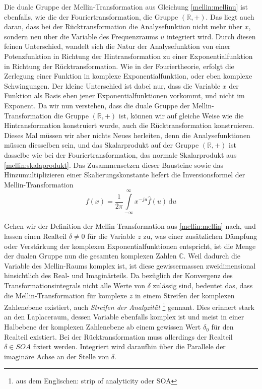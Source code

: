 Die duale Gruppe der Mellin-Transformation aus Gleichung \eqref{mellin:mellinu} ist ebenfalls, wie die der Fouriertransformation, die Gruppe 
$(\mathbb{R},+)$.
Das liegt auch daran, dass bei der Rücktransformation die Analysefunktion nicht mehr über $x$, sondern neu über die Variable des 
Frequenzraums $u$ integriert wird. 
Durch diesen feinen Unterschied, wandelt sich die Natur der Analysefunktion von einer Potenzfunktion in Richtung der Hintransformation zu 
einer Exponentialfunktion in Richtung der Rücktransformation.
Wie in der Fouriertheorie, erfolgt die Zerlegung einer Funktion in komplexe Exponentialfunktion, oder eben komplexe Schwingungen.
Der kleine Unterschied ist dabei nur, dass die Variable $x$ der Funktion als Basis eben jener Exponentialfunktionen vorkommt, und nicht 
im Exponent.
Da wir nun verstehen, dass die duale Gruppe der Mellin-Transformation die Gruppe $(\mathbb{R},+)$ ist, können wir auf gleiche Weise wie 
die Hintransformation konstruiert wurde, auch die Rücktransformation konstruieren.
Dieses Mal müssen wir aber nichts Neues herleiten, denn die Analysefunktionen müssen diesselben sein, und das Skalarprodukt auf der 
Gruppe $(\mathbb{R},+)$ ist dasselbe wie bei der Fouriertransformation, das normale Skalarprodukt aus \eqref{mellin:skalaprodukt}. 
Das Zusammensetzen dieser Bausteine sowie das Hinzumultiplizieren einer Skalierungskonstante liefert die Inversionsformel der 
Mellin-Transformation
\begin{equation}
    f(x) = \frac{1}{2\pi} \int\limits_{-\infty}^{\infty} x^{-ju} \hat{f}(u) \,\mathrm{d}u
    \label{mellin:mellininvu}
\end{equation}

Gehen wir der Definition der Mellin-Transformation aus \eqref{mellin:mellin} nach, und lassen einen Realteil $\delta \neq 0$ für die Variable $z$ zu, 
was einer zusätzlichen Dämpfung oder Verstärkung der komplexen Exponentialfunktionen entspricht, ist die Menge der dualen Gruppe nun die gesamten 
komplexen Zahlen $\mathbb{C}$.
Weil dadurch die Variable des Mellin-Raums komplex ist, ist diese gewissermassen zweidimensional hinsichtlich des Real- und Imaginärteils. 
Da bezüglich der Konvergenz des Transformationsintegrals nicht alle Werte von $\delta$ zulässig sind, bedeutet das, dass die Mellin-Transformation 
für komplexe $z$ in einem Streifen der komplexen Zahlenebene existiert, auch \emph{Streifen der Analyzität} 
\footnote{aus dem Englischen: strip of analyticity oder SOA} gennant.
Dies erinnert stark an den Laplaceraum, dessen Variable ebenfalls komplex ist und meist in einer Halbebene der komplexen Zahlenebene ab einem 
gewissen Wert $\delta_0$ für den Realteil existiert.
Bei der Rücktransformation muss allerdings der Realteil $\delta \in SOA$ fixiert werden. 
Integriert wird daraufhin über die Parallele der imaginäre Achse an der Stelle von $\delta$. 

